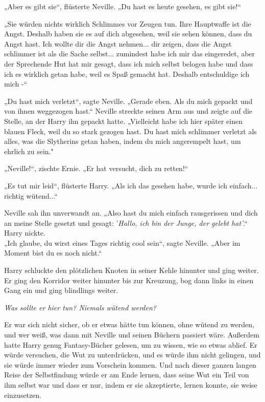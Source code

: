 {„Aber es gibt sie“, flüsterte Neville. „Du hast es heute gesehen, es gibt sie!“

„Sie würden nichts wirklich Schlimmes vor Zeugen tun. Ihre Hauptwaffe ist die Angst. Deshalb haben sie es auf dich abgesehen, weil sie sehen können, dass du Angst hast. Ich wollte dir die Angst nehmen... dir zeigen, dass die Angst schlimmer ist als die Sache selbst... zumindest habe ich mir das eingeredet, aber der Sprechende Hut hat mir gesagt, dass ich mich selbst belogen habe und dass ich es wirklich getan habe, weil es Spaß gemacht hat. Deshalb entschuldige ich mich -“

„Du hast mich verletzt“, sagte Neville. „Gerade eben. Als du mich gepackt und von ihnen weggezogen hast.“ Neville streckte seinen Arm aus und zeigte auf die Stelle, an der Harry ihn gepackt hatte. „Vielleicht habe ich hier später einen blauen Fleck, weil du so stark gezogen hast. Du hast mich schlimmer verletzt als alles, was die Slytherins getan haben, indem du mich angerempelt hast, um ehrlich zu sein."

„Neville!“, zischte Ernie. „Er hat versucht, dich zu retten!“

„Es tut mir leid“, flüsterte Harry. „Als ich das gesehen habe, wurde ich einfach... richtig wütend...“

Neville sah ihn unverwandt an. „Also hast du mich einfach rausgerissen und dich an meine Stelle gesetzt und gesagt: '\emph{Hallo, ich bin der Junge, der gelebt hat'}.“\\ Harry nickte.\\ „Ich glaube, du wirst eines Tages richtig cool sein“, sagte Neville. „Aber im Moment bist du es noch nicht.“

Harry schluckte den plötzlichen Knoten in seiner Kehle hinunter und ging weiter. Er ging den Korridor weiter hinunter bis zur Kreuzung, bog dann links in einen Gang ein und ging blindlings weiter.

\emph{Was sollte er hier tun? Niemals wütend werden?}

Er war sich nicht sicher, ob er etwas hätte tun können, ohne wütend zu werden, und wer weiß, was dann mit Neville und seinen Büchern passiert wäre. Außerdem hatte Harry genug Fantasy-Bücher gelesen, um zu wissen, wie so etwas ablief. Er würde versuchen, die Wut zu unterdrücken, und es würde ihm nicht gelingen, und sie würde immer wieder zum Vorschein kommen. Und nach dieser ganzen langen Reise der Selbstfindung würde er am Ende lernen, dass seine Wut ein Teil von ihm selbst war und dass er nur, indem er sie akzeptierte, lernen konnte, sie weise einzusetzen.

}
